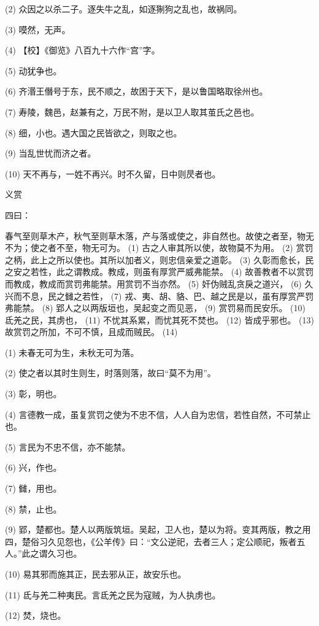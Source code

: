 \documentclass[12pt,UTF8]{ctexbook}
\begin{document}
(2) 众因之以杀二子。逐失牛之乱，如逐猘狗之乱也，故祸同。

(3) 嗼然，无声。

(4) 【校】《御览》八百九十六作“宫”字。

(5) 动犹争也。

(6) 齐湣王僭号于东，民不顺之，故困于天下，是以鲁国略取徐州也。

(7) 寿陵，魏邑，赵兼有之，万民不附，是以卫人取其茧氏之邑也。

(8) 细，小也。遇大国之民皆欲之，则取之也。

(9) 当乱世忧而济之者。

(10) 天不再与，一姓不再兴。时不久留，日中则昃者也。





义赏


四曰：

春气至则草木产，秋气至则草木落，产与落或使之，非自然也。故使之者至，物无不为；使之者不至，物无可为。 (1) 古之人审其所以使，故物莫不为用。 (2) 赏罚之柄，此上之所以使也。其所以加者义，则忠信亲爱之道彰。 (3) 久彰而愈长，民之安之若性，此之谓教成。教成，则虽有厚赏严威弗能禁。 (4) 故善教者不以赏罚而教成，教成而赏罚弗能禁。用赏罚不当亦然。 (5) 奸伪贼乱贪戾之道兴， (6) 久兴而不息，民之雠之若性， (7) 戎、夷、胡、貉、巴、越之民是以，虽有厚赏严罚弗能禁。 (8) 郢人之以两版垣也，吴起变之而见恶， (9) 赏罚易而民安乐。 (10) 氐羌之民，其虏也， (11) 不忧其系累，而忧其死不焚也。 (12) 皆成乎邪也。 (13) 故赏罚之所加，不可不慎，且成而贼民。 (14)

(1) 未春无可为生，未秋无可为落。

(2) 使之者以其时生则生，时落则落，故曰“莫不为用”。

(3) 彰，明也。

(4) 言德教一成，虽复赏罚之使为不忠不信，人人自为忠信，若性自然，不可禁止也。

(5) 言民为不忠不信，亦不能禁。

(6) 兴，作也。

(7) 雠，用也。

(8) 禁，止也。

(9) 郢，楚都也。楚人以两版筑垣。吴起，卫人也，楚以为将。变其两版，教之用四，楚俗习久见怨也，《公羊传》曰：“文公逆祀，去者三人；定公顺祀，叛者五人。”此之谓久习也。

(10) 易其邪而施其正，民去邪从正，故安乐也。

(11) 氐与羌二种夷民。言氐羌之民为寇贼，为人执虏也。

(12) 焚，烧也。
\end{document}
